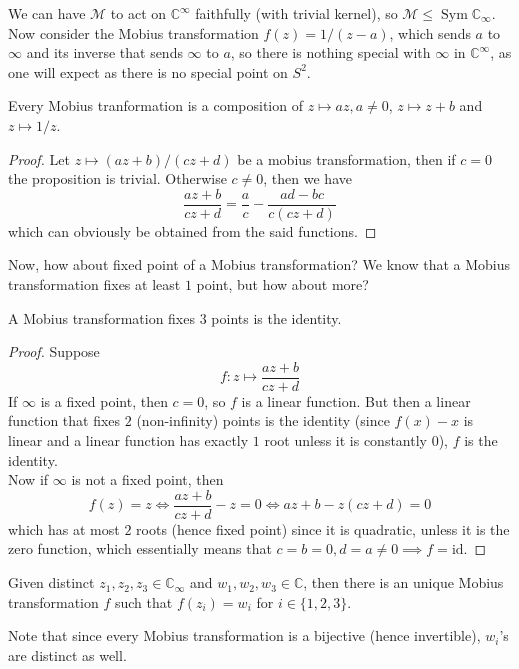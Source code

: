 We can have $\mathcal M$ to act on $\mathbb C^\infty$ faithfully (with trivial kernel), so $\mathcal M\le\operatorname{Sym}\mathbb C_\infty$.
Now consider the Mobius transformation $f(z)=1/(z-a)$, which sends $a$ to $\infty$ and its inverse that sends $\infty$ to $a$, so there is nothing special with $\infty$ in $\mathbb C^\infty$, as one will expect as there is no special point on $S^2$.
\begin{proposition}\label{decomp_mobius}
    Every Mobius tranformation is a composition of $z\mapsto az,a\neq 0$, $z\mapsto z+b$ and $z\mapsto 1/z$.
\end{proposition}
\begin{proof}
    Let $z\mapsto (az+b)/(cz+d)$ be a mobius transformation, then if $c=0$ the proposition is trivial.
    Otherwise $c\neq 0$, then we have
    $$\frac{az+b}{cz+d}=\frac{a}{c}-\frac{ad-bc}{c(cz+d)}$$
    which can obviously be obtained from the said functions.
\end{proof}
Now, how about fixed point of a Mobius transformation?
We know that a Mobius transformation fixes at least $1$ point, but how about more?
\begin{proposition}
    A Mobius transformation fixes $3$ points is the identity.
\end{proposition}
\begin{proof}
    Suppose
    $$f:z\mapsto\frac{az+b}{cz+d}$$
    If $\infty$ is a fixed point, then $c=0$, so $f$ is a linear function.
    But then a linear function that fixes $2$ (non-infinity) points is the identity (since $f(x)-x$ is linear and a linear function has exactly $1$ root unless it is constantly $0$), $f$ is the identity.\\
    Now if $\infty$ is not a fixed point, then
    $$f(z)=z\iff \frac{az+b}{cz+d}-z=0\iff az+b-z(cz+d)=0$$
    which has at most $2$ roots (hence fixed point) since it is quadratic, unless it is the zero function, which essentially means that $c=b=0,d=a\neq 0\implies f=\mathrm{id}$.
\end{proof}
\begin{proposition}\label{mobius_3pts}
    Given distinct $z_1,z_2,z_3\in\mathbb C_\infty$ and $w_1,w_2,w_3\in\mathbb C$, then there is an unique Mobius transformation $f$ such that $f(z_i)=w_i$ for $i\in\{1,2,3\}$.
\end{proposition}
Note that since every Mobius transformation is a bijective (hence invertible), $w_i$'s are distinct as well.
